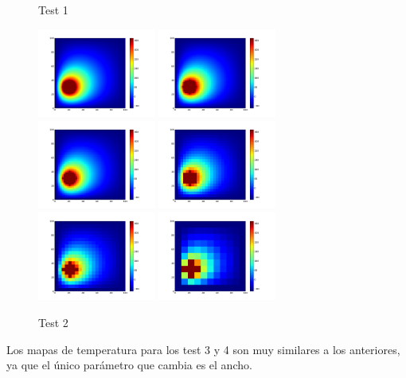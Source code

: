 \documentclass[a4paper]{article}
\begin{document}
\begin{center}
\begin{figure}[h!]
\caption{Test 1}
\end{figure}
\newpage
\begin{figure}[h!]
\centering
\includegraphics[width=110pt]{img/Parabrisas2-1.png} \includegraphics[width=110pt]{img/Parabrisas2-2.png} \includegraphics[width=110pt]{img/Parabrisas2-2,5.png} \newline \includegraphics[width=110pt]{img/Parabrisas2-4.png} \includegraphics[width=110pt]{img/Parabrisas2-5.png} \includegraphics[width=110pt]{img/Parabrisas2-10.png} \newline
\caption{Test 2}
\end{figure}
\end{center}
Los mapas de temperatura para los test 3 y 4 son muy similares a los anteriores, ya que el único parámetro que cambia es el ancho.
\end{document}
